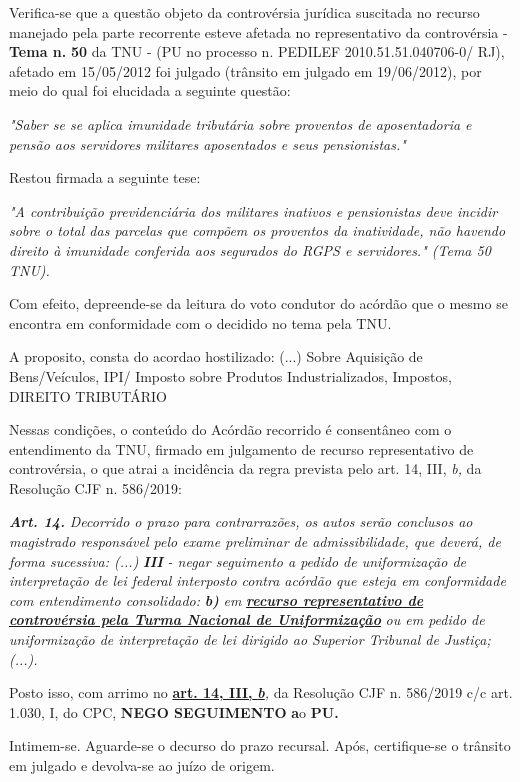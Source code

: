 \documentclass[12pt]{article}
\begin{document}
\justifying
\noindent Verifica-se que a questão objeto da controvérsia jurídica suscitada no recurso manejado pela parte recorrente esteve afetada no representativo da controvérsia - \textbf{Tema n. }\textbf{50} da TNU - (PU no processo n. PEDILEF 2010.51.51.040706-0/ RJ),  afetado em 15/05/2012 foi julgado (trânsito em julgado em 19/06/2012), por meio do qual foi elucidada a seguinte questão:

\noindent \textit{"Saber se se aplica imunidade tributária sobre proventos de aposentadoria e pensão aos servidores militares aposentados e seus pensionistas."}

\noindent Restou firmada a seguinte tese:

\noindent \textit{"A contribuição previdenciária dos militares inativos e pensionistas deve incidir sobre o total das parcelas que compõem os proventos da inatividade, não havendo direito à imunidade conferida aos segurados do RGPS e servidores." (Tema 50 TNU).}

\noindent Com efeito, depreende-se da leitura do voto condutor do acórdão que o mesmo se encontra em conformidade com o decidido no  tema pela TNU.

\noindent A proposito, consta do acordao hostilizado: (...) Sobre Aquisição de Bens/Veículos, IPI/ Imposto sobre Produtos Industrializados, Impostos, DIREITO TRIBUTÁRIO

\noindent Nessas condições, o conteúdo do Acórdão recorrido é consentâneo com o entendimento da TNU, firmado em julgamento de recurso representativo de controvérsia, o que atrai a incidência da regra prevista pelo art. 14, III, \textit{b,} da Resolução CJF n. 586/2019:

\noindent \textit{\textbf{Art. 14.}}\textit{ Decorrido o prazo para contrarrazões, os autos serão conclusos ao magistrado responsável pelo exame preliminar de admissibilidade, que deverá, de forma sucessiva: (...) }\textit{\textbf{III }}\textit{- negar seguimento a pedido de uniformização de interpretação de lei federal interposto contra acórdão que esteja em conformidade com entendimento consolidado: }\textit{\textbf{b)}}\textit{ em }\uline{\textit{\textbf{recurso representativo de controvérsia pela Turma Nacional de Uniformização}}}\textit{ ou em pedido de uniformização de interpretação de lei dirigido ao Superior Tribunal de Justiça;(...).}

\noindent Posto isso, com arrimo no \uline{\textbf{art. 14, III, }}\uline{\textit{\textbf{b}}}\textit{,} da Resolução CJF n. 586/2019 c/c art. 1.030, I, do CPC, \textbf{NEGO SEGUIMENTO }\textbf{a}o\textbf{ PU}\textbf{.}

\noindent Intimem-se. Aguarde-se o decurso do prazo recursal. Após, certifique-se o trânsito em julgado e devolva-se ao juízo de origem.
\end{document}
